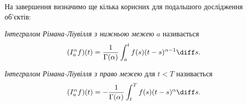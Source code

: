 На завершення визначимо ще кілька корисних для подальшого дослідження об'єктів:
\begin{definition}
    \textit{Інтегралом Рімана-Ліувілля з нижньою межею} $a$ називається
    \begin{equation}
        (I_a^\alpha f)(t) = \frac{1}{\Gamma(\alpha)} \int_a^t f(s) (t - s)^{\alpha - 1} \diff s.
    \end{equation}
\end{definition}
\begin{definition}
    \textit{Інтегралом Рімана-Ліувілля з право межею} для $t < T$ називається
    \begin{equation}
        (I_a^\alpha f)(t) = -\frac{1}{\Gamma(\alpha)} \int_t^T f(s) (t - s)^\alpha \diff s.
    \end{equation}
\end{definition}
